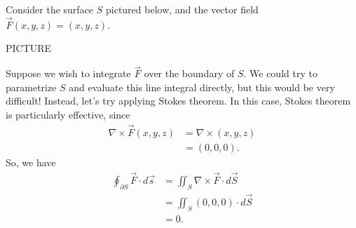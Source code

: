 \documentclass{ximera}
\begin{document}
\begin{example}
Consider the surface $S$ pictured below, and the vector field $\vec{F}(x,y,z) = (x,y,z)$.

PICTURE

Suppose we wish to integrate $\vec{F}$ over the boundary of $S$. We could try to parametrize $S$ and evaluate this line integral directly, but this would be very difficult! Instead, let's try applying Stokes theorem. In this case, Stokes theorem is particularly effective, since
\begin{align*}
\nabla \times\vec{F}(x,y,z) &= \nabla\times (x,y,z)\\
&= (0,0,0).
\end{align*}
So, we have
\begin{align*}
\oint_{\partial S}\vec{F}\cdot d\vec{s} &= \iint_S\nabla\times\vec{F}\cdot d\vec{S}\\
&= \iint_S (0,0,0)\cdot d\vec{S}\\
&= 0.
\end{align*}
\end{example}
\end{document}
